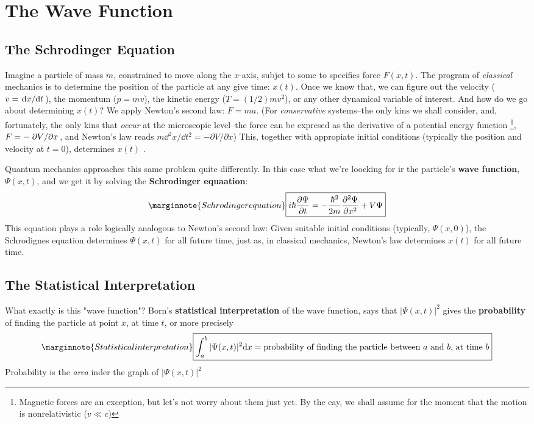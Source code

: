 \chapter{The Wave Function}
\section{The Schrodinger Equation}
Imagine a particle of mass $m$, constrained to move along the $x$-axis, subjet to some to specifies force $F(x,t)$. The program of \textit{classical} mechanics is to determine the position of the particle at any give time: $x(t)$. Once we know that, we can figure out the velocity ($v=\dv*{x}{t}$), the momentum ($p=mv$), the kinetic energy ($T=(1/2)mv^2$), or any other dynamical variable of interest. And how do we go about determining $x(t)$? We apply Newton's second law: $F=ma$. (For \textit{conservative} systems--the only kins we shall consider, and, fortunately, the only kins that \textit{occur} at the microscopic level--the force can be expresed as the derivative of a potential energy function \footnote{Magnetic forces are an exception, but let's not worry about them just yet. By the eay, we shall assume for the moment that the motion is nonrelativistic ($v\ll c$)}, $F=-\pdv*{V}{x}$, and Newton's law reads $m\dd ^2x/\dd t^2=-\partial V/\partial x$) This, together with appropiate initial conditions (typically the position and velocity at $t=0$), determines $x(t)$ .

Quantum mechanics approaches this same problem quite differently. In this case what we're loocking for ir the particle's \textbf{wave function}, $\Psi(x,t)$, and we get it by solving the \textbf{Schrodinger equaation}:
\begin{equation}\label{1.1}\marginnote{Schrodinger equation}
	\boxed{i\hbar\pdv{\Psi}{t}=-\frac{\hbar^2}{2m}\pdv[2]{\Psi}{x}+V\Psi}
\end{equation}
This equation plays a role logically analogous to Newton's second law: Given suitable initial conditions (typically, $\Psi(x,0)$), the Schrodignes equation determines $\Psi(x,t)$ for all future time, just as, in classical mechanics, Newton's law determines $x(t)$ for all future time.

\section{The Statistical Interpretation}
What exactly is this "wave function"? Born's \textbf{statistical interpretation} of the wave function, says that $|\Psi(x,t)|^2 $ gives the \textbf{probability} of finding the particle at point $x$, at time $t$, or more precisely
\begin{equation}\label{1.3}\marginnote{Statistical interpretation}
	\boxed{\int_a^b|\Psi(x,t)|^2\dd x=\mbox{probability of finding the particle  between $a$ and $b$, at time $b$}}
\end{equation}
Probability is the \textit{area} inder the graph of $|\Psi(x,t)|^2$

